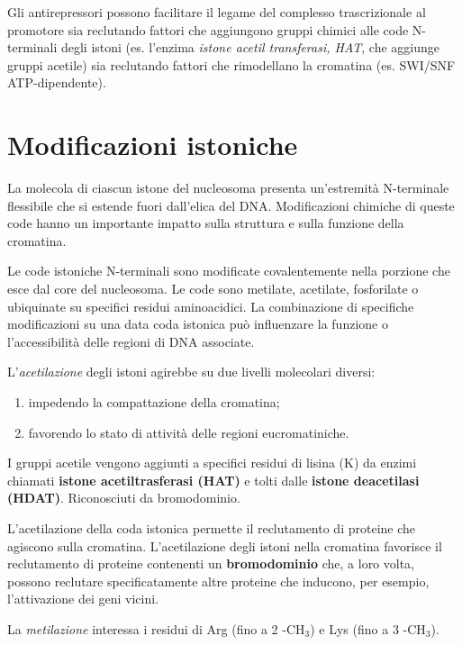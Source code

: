 \documentclass[11pt]{book}
\begin{document}
Gli antirepressori possono facilitare il legame del complesso
trascrizionale al promotore sia reclutando fattori che aggiungono gruppi
chimici alle code N-terminali degli istoni (es. l'enzima \emph{istone
acetil transferasi, HAT}, che aggiunge gruppi acetile) sia reclutando
fattori che rimodellano la cromatina (es. SWI/SNF ATP-dipendente).

\section{Modificazioni istoniche}\label{modificazioni-istoniche}

La molecola di ciascun istone del nucleosoma presenta un'estremità
N-terminale flessibile che si estende fuori dall'elica del DNA.
Modificazioni chimiche di queste code hanno un importante impatto sulla
struttura e sulla funzione della cromatina.

Le code istoniche N-terminali sono modificate covalentemente nella
porzione che esce dal core del nucleosoma. Le code sono metilate,
acetilate, fosforilate o ubiquinate su specifici residui aminoacidici.
La combinazione di specifiche modificazioni su una data coda istonica
può influenzare la funzione o l'accessibilità delle regioni di DNA
associate.

L'\emph{acetilazione} degli istoni agirebbe su due livelli molecolari
diversi:

\begin{enumerate}
\def\labelenumi{\arabic{enumi}.}
\itemsep1pt\parskip0pt
\item
  impedendo la compattazione della cromatina;
\item
  favorendo lo stato di attività delle regioni eucromatiniche.
\end{enumerate}

I gruppi acetile vengono aggiunti a specifici residui di lisina (K) da
enzimi chiamati \textbf{istone acetiltrasferasi (HAT)} e tolti dalle
\textbf{istone deacetilasi (HDAT)}. Riconosciuti da bromodominio.

L'acetilazione della coda istonica permette il reclutamento di proteine
che agiscono sulla cromatina. L'acetilazione degli istoni nella
cromatina favorisce il reclutamento di proteine contenenti un
\textbf{bromodominio} che, a loro volta, possono reclutare
specificatamente altre proteine che inducono, per esempio, l'attivazione
dei geni vicini.

La \emph{metilazione} interessa i residui di Arg (fino a 2 -CH\(_3\)) e
Lys (fino a 3 -CH\(_3\)).
\end{document}
